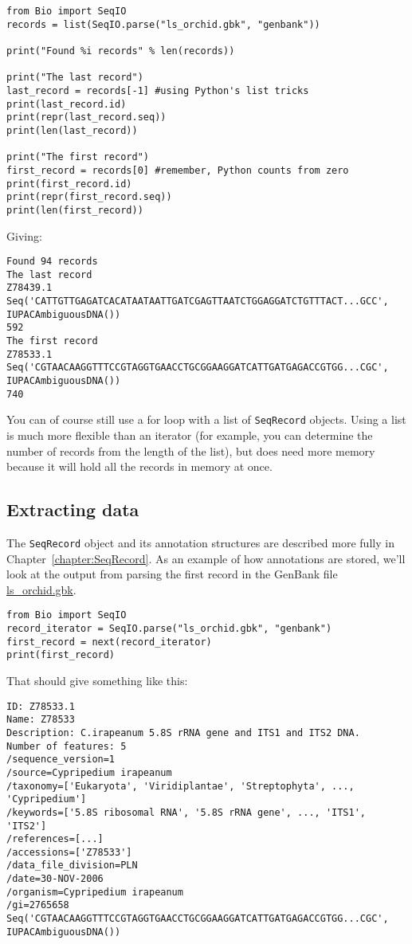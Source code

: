\documentclass{report}
\begin{document}
\begin{verbatim}
from Bio import SeqIO
records = list(SeqIO.parse("ls_orchid.gbk", "genbank"))

print("Found %i records" % len(records))

print("The last record")
last_record = records[-1] #using Python's list tricks
print(last_record.id)
print(repr(last_record.seq))
print(len(last_record))

print("The first record")
first_record = records[0] #remember, Python counts from zero
print(first_record.id)
print(repr(first_record.seq))
print(len(first_record))
\end{verbatim}

\noindent Giving:

\begin{verbatim}
Found 94 records
The last record
Z78439.1
Seq('CATTGTTGAGATCACATAATAATTGATCGAGTTAATCTGGAGGATCTGTTTACT...GCC', IUPACAmbiguousDNA())
592
The first record
Z78533.1
Seq('CGTAACAAGGTTTCCGTAGGTGAACCTGCGGAAGGATCATTGATGAGACCGTGG...CGC', IUPACAmbiguousDNA())
740
\end{verbatim}

You can of course still use a for loop with a list of \verb|SeqRecord| objects.  Using a list is much more flexible than an iterator (for example, you can determine the number of records from the length of the list), but does need more memory because it will hold all the records in memory at once.

\subsection{Extracting data}

The \verb|SeqRecord| object and its annotation structures are described more fully in
Chapter~\ref{chapter:SeqRecord}.  As an example of how annotations are stored, we'll look at the output from parsing the first record in the GenBank file \href{http://biopython.org/DIST/docs/tutorial/examples/ls_orchid.gbk}{ls\_orchid.gbk}.

\begin{verbatim}
from Bio import SeqIO
record_iterator = SeqIO.parse("ls_orchid.gbk", "genbank")
first_record = next(record_iterator)
print(first_record)
\end{verbatim}

\noindent That should give something like this:

\begin{verbatim}
ID: Z78533.1
Name: Z78533
Description: C.irapeanum 5.8S rRNA gene and ITS1 and ITS2 DNA.
Number of features: 5
/sequence_version=1
/source=Cypripedium irapeanum
/taxonomy=['Eukaryota', 'Viridiplantae', 'Streptophyta', ..., 'Cypripedium']
/keywords=['5.8S ribosomal RNA', '5.8S rRNA gene', ..., 'ITS1', 'ITS2']
/references=[...]
/accessions=['Z78533']
/data_file_division=PLN
/date=30-NOV-2006
/organism=Cypripedium irapeanum
/gi=2765658
Seq('CGTAACAAGGTTTCCGTAGGTGAACCTGCGGAAGGATCATTGATGAGACCGTGG...CGC', IUPACAmbiguousDNA())
\end{verbatim}
\end{document}
